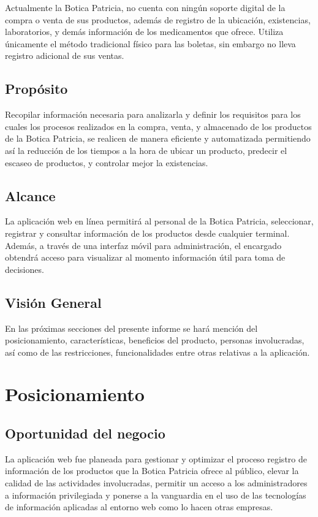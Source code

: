 \documentclass[a4paper,11pt, spanish]{report}
\begin{document}
Actualmente la Botica Patricia, no cuenta con ningún soporte digital de la compra o venta de sus productos, además de registro de la ubicación, existencias, laboratorios, y demás información de los medicamentos que ofrece. Utiliza únicamente el método tradicional físico para las boletas, sin embargo no lleva registro adicional de sus ventas.

      \subsection{Propósito}
      Recopilar información necesaria para analizarla y definir los requisitos para los cuales los procesos realizados en la compra, venta, y almacenado de los productos de la Botica Patricia, se realicen de manera eficiente y automatizada permitiendo así la reducción de los tiempos a la hora de ubicar un producto, predecir el escaseo de productos, y controlar mejor la existencias.
      
      \subsection{Alcance}
      La aplicación web en línea permitirá al personal de la Botica Patricia,  seleccionar, registrar y consultar información de los productos desde cualquier terminal. Además, a través de una interfaz móvil para administración, el encargado obtendrá acceso para visualizar al momento información útil para toma de decisiones.
      
      \subsection{Visión General}
      En las próximas secciones del presente informe se hará mención del posicionamiento, características, beneficios del producto,	personas	involucradas,	así	como	de	las restricciones, funcionalidades entre otras relativas a la aplicación.
      
    \section{Posicionamiento}
      \subsection{Oportunidad del negocio}
      La aplicación web fue planeada para gestionar y optimizar el proceso registro de información de los productos que la Botica Patricia ofrece al público, elevar la calidad de las actividades involucradas, permitir un acceso a los administradores a información privilegiada y ponerse a la vanguardia en el uso de las tecnologías de información aplicadas al entorno web como lo hacen otras empresas.
      
\end{document}
